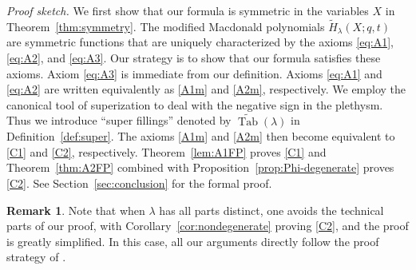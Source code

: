 \documentclass[11pt]{article}
\theoremstyle{definition}
\newtheorem{remark}[theo]{Remark}
\numberwithin{equation}{section}
\DeclareMathOperator{\PQT}{Tab}
\begin{document}
\noindent\emph{Proof sketch.} We first show that our formula is symmetric in the variables $X$ in Theorem~\ref{thm:symmetry}. The modified Macdonald polynomials $\widetilde{H}_{\lambda}(X;q,t)$ are symmetric functions that are uniquely characterized by the axioms \eqref{eq:A1}, \eqref{eq:A2}, and \eqref{eq:A3}. Our strategy is to show that our formula satisfies these axioms. Axiom \eqref{eq:A3} is immediate from our definition. Axioms \eqref{eq:A1} and \eqref{eq:A2} are written equivalently as \eqref{A1m} and \eqref{A2m}, respectively. We employ the canonical tool of superization to deal with the negative sign in the plethysm. Thus we introduce ``super fillings'' denoted by $\widetilde{\PQT}(\lambda)$ in Definition~\ref{def:super}. The axioms \eqref{A1m} and \eqref{A2m} then become equivalent to \eqref{C1} and \eqref{C2}, respectively. Theorem~\ref{lem:A1FP} proves \eqref{C1} and Theorem~\ref{thm:A2FP} combined with Proposition~\ref{prop:Phi-degenerate} proves \eqref{C2}. See Section~\ref{sec:conclusion} for the formal proof.

\begin{remark}
Note that when $\lambda$ has all parts distinct, one avoids the technical parts of our proof, with Corollary~\ref{cor:nondegenerate} proving \eqref{C2}, and the proof is greatly simplified. In this case, all our arguments directly follow the proof strategy of \cite[Theorem 2.2]{HHL05}.
\end{remark}
\end{document}
